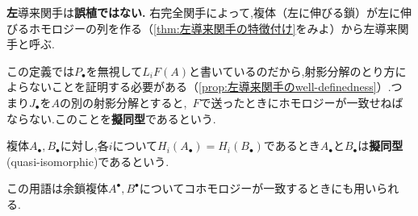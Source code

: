 \textbf{左}導来関手は\textbf{誤植ではない.} 右完全関手によって,複体（左に伸びる鎖）が左に伸びるホモロジーの列を作る（\ref{thm:左導来関手の特徴付け}をみよ）から左導来関手と呼ぶ.

この定義では$P_\bullet$を無視して$L_i F(A)$と書いているのだから,射影分解のとり方によらないことを証明する必要がある（\ref{prop:左導来関手のwell-definedness}）.つまり$J_\bullet$を$A$の別の射影分解とすると,~$F$で送ったときにホモロジーが一致せねばならない.このことを\textbf{擬同型}であるという.

\begin{defi}[擬同型]
	複体$A_\bullet,B_\bullet$に対し,各$i$について$H_i(A_\bullet)=H_i(B_\bullet)$であるとき$A_\bullet$と$B_\bullet$は\textbf{擬同型}(quasi-isomorphic)であるという.
\end{defi}

この用語は余鎖複体$A^\bullet,B^\bullet$についてコホモロジーが一致するときにも用いられる.

